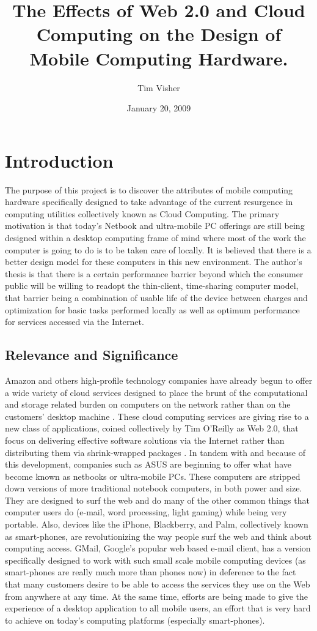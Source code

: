 \documentclass[12pt,oneside,letterpaper]{article}
\author{Tim Visher}
\title{The Effects of Web 2.0 and Cloud Computing on the Design of Mobile Computing Hardware.}
\date{January 20, 2009}
\begin{document}

\tableofcontents
\newpage

\section{Introduction}

The purpose of this project is to discover the attributes of mobile computing
hardware specifically designed to take advantage of the current resurgence in
computing utilities collectively known as Cloud Computing.  The primary
motivation is that today's Netbook and ultra-mobile PC offerings are still being
designed within a desktop computing frame of mind where most of the work the
computer is going to do is to be taken care of locally.  It is believed that
there is a better design model for these computers in this new environment.  The
author's thesis is that there is a certain performance barrier beyond which the
consumer public will be willing to readopt the thin-client, time-sharing
computer model, that barrier being a combination of usable life of the device
between charges and optimization for basic tasks performed locally as well as
optimum performance for services accessed via the Internet.

\subsection{Relevance and Significance}

Amazon and others high-profile technology companies have already begun to offer
a wide variety of cloud services designed to place the brunt of the
computational and storage related burden on computers on the network rather than
on the customers' desktop machine \citep{reiss2008}.  These cloud computing
services are giving rise to a new class of applications, coined collectively by
Tim O'Reilly as Web 2.0, that focus on delivering effective software solutions
via the Internet rather than distributing them via shrink-wrapped packages
\citep{bleicher2006}.  In tandem with and because of this development, companies
such as ASUS are beginning to offer what have become known as netbooks or
ultra-mobile PCs.  These computers are stripped down versions of more
traditional notebook computers, in both power and size.  They are designed to
surf the web and do many of the other common things that computer users do
(e-mail, word processing, light gaming) while being very portable.  Also,
devices like the iPhone, Blackberry, and Palm, collectively known as
smart-phones, are revolutionizing the way people surf the web and think about
computing access.  GMail, Google's popular web based e-mail client, has a
version specifically designed to work with such small scale mobile computing
devices (as smart-phones are really much more than phones now) in deference to
the fact that many customers desire to be able to access the services they use
on the Web from anywhere at any time.  At the same time, efforts are being made
to give the experience of a desktop application to all mobile users, an effort
that is very hard to achieve on today's computing platforms (especially
smart-phones).
\end{document}
